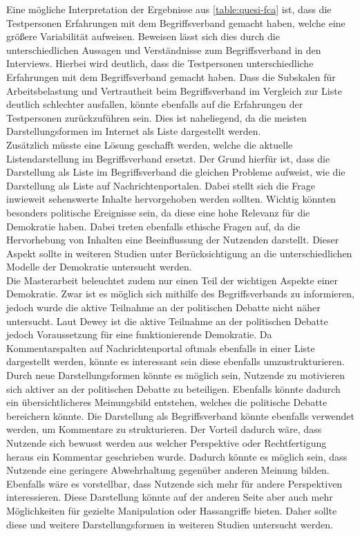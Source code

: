 Eine mögliche Interpretation der Ergebnisse aus \autoref{table:quesi-fca} ist, dass die Testpersonen Erfahrungen mit dem Begriffsverband gemacht haben, welche eine größere Variabilität aufweisen.
Beweisen lässt sich dies durch die unterschiedlichen Aussagen und Verständnisse zum Begriffsverband in den Interviews.
Hierbei wird deutlich, dass die Testpersonen unterschiedliche Erfahrungen mit dem Begriffsverband gemacht haben.
Dass die Subskalen für Arbeitsbelastung und Vertrautheit beim Begriffsverband im Vergleich zur Liste deutlich schlechter ausfallen, könnte ebenfalls auf die Erfahrungen der Testpersonen zurückzuführen sein.
Dies ist naheliegend, da die meisten Darstellungsformen im Internet als Liste dargestellt werden. \\

Zusätzlich müsste eine Lösung geschafft werden, welche die aktuelle Listendarstellung im Begriffsverband ersetzt.
Der Grund hierfür ist, dass die Darstellung als Liste im Begriffsverband die gleichen Probleme aufweist, wie die Darstellung als Liste auf Nachrichtenportalen.
Dabei stellt sich die Frage inwieweit sehenswerte Inhalte hervorgehoben werden sollten.
Wichtig könnten besonders politische Ereignisse sein, da diese eine hohe Relevanz für die Demokratie haben.
Dabei treten ebenfalls ethische Fragen auf, da die Hervorhebung von Inhalten eine Beeinflussung der Nutzenden darstellt.
Dieser Aspekt sollte in weiteren Studien unter Berücksichtigung an die unterschiedlichen Modelle der Demokratie untersucht werden.\\

Die Masterarbeit beleuchtet zudem nur einen Teil der wichtigen Aspekte einer Demokratie.
Zwar ist es möglich sich mithilfe des Begriffsverbands zu informieren, jedoch wurde die aktive Teilnahme an der politischen Debatte nicht näher untersucht.
Laut Dewey ist die aktive Teilnahme an der politischen Debatte jedoch Voraussetzung für eine funktionierende Demokratie.
Da Kommentarspalten auf Nachrichtenportal oftmals ebenfalls in einer Liste dargestellt werden, könnte es interessant sein diese ebenfalls umzustrukturieren.
Durch neue Darstellungsformen könnte es möglich sein, Nutzende zu motivieren sich aktiver an der politischen Debatte zu beteiligen.
Ebenfalls könnte dadurch ein übersichtlicheres Meinungsbild entstehen, welches die politische Debatte bereichern könnte.
Die Darstellung als Begriffsverband könnte ebenfalls verwendet werden, um Kommentare zu strukturieren.
Der Vorteil dadurch wäre, dass Nutzende sich bewusst werden aus welcher Perspektive oder Rechtfertigung heraus ein Kommentar geschrieben wurde.
Dadurch könnte es möglich sein, dass Nutzende eine geringere Abwehrhaltung gegenüber anderen Meinung bilden.
Ebenfalls wäre es vorstellbar, dass Nutzende sich mehr für andere Perspektiven interessieren.
Diese Darstellung könnte auf der anderen Seite aber auch mehr Möglichkeiten für gezielte Manipulation oder Hassangriffe bieten.
Daher sollte diese und weitere Darstellungsformen in weiteren Studien untersucht werden.\\

